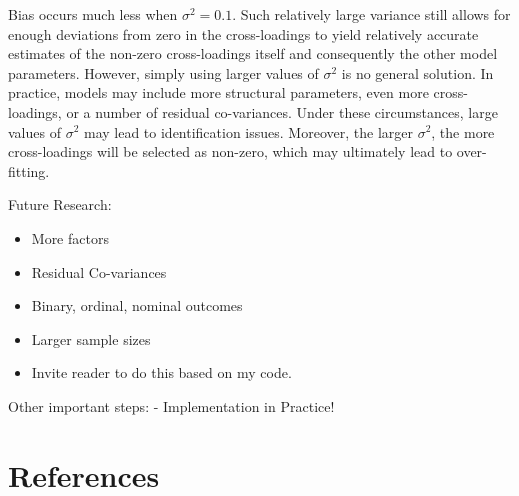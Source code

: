 \documentclass[
  man, donotrepeattitle,floatsintext]{apa6}
\providecommand{\tightlist}{%
  \setlength{\itemsep}{0pt}\setlength{\parskip}{0pt}}
\begin{document}
Bias occurs much less when \(\sigma^2 = 0.1\). Such relatively large variance still allows for enough deviations from zero in the cross-loadings to yield relatively accurate estimates of the non-zero cross-loadings itself and consequently the other model parameters. However, simply using larger values of \(\sigma^2\) is no general solution. In practice, models may include more structural parameters, even more cross-loadings, or a number of residual co-variances. Under these circumstances, large values of \(\sigma^2\) may lead to identification issues. Moreover, the larger \(\sigma^2\), the more cross-loadings will be selected as non-zero, which may ultimately lead to over-fitting.

Future Research:

\begin{itemize}
\tightlist
\item
  More factors
\item
  Residual Co-variances
\item
  Binary, ordinal, nominal outcomes
\item
  Larger sample sizes
\item
  Invite reader to do this based on my code.
\end{itemize}

Other important steps:
- Implementation in Practice!

\clearpage

\hypertarget{references}{%
\section{References}\label{references}}

\begingroup
\setlength{\parindent}{-0.5in}
\setlength{\leftskip}{0.5in}
\end{document}
